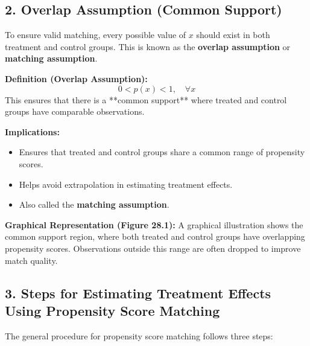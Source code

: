 \documentclass[10pt, oneside]{article}
\begin{document}
\subsection{2. Overlap Assumption (Common Support)}
To ensure valid matching, every possible value of $x$ should exist in both treatment and control groups. This is known as the \textbf{overlap assumption} or \textbf{matching assumption}.

\textbf{Definition (Overlap Assumption):}
\begin{equation}
0 < p(x) < 1, \quad \forall x
\end{equation}
This ensures that there is a **common support** where treated and control groups have comparable observations.

\textbf{Implications:}
\begin{itemize}
    \item Ensures that treated and control groups share a common range of propensity scores.
    \item Helps avoid extrapolation in estimating treatment effects.
    \item Also called the \textbf{matching assumption}.
\end{itemize}

\textbf{Graphical Representation (Figure 28.1):}  
A graphical illustration shows the common support region, where both treated and control groups have overlapping propensity scores. Observations outside this range are often dropped to improve match quality.

\subsection{3. Steps for Estimating Treatment Effects Using Propensity Score Matching}
The general procedure for propensity score matching follows three steps:
\end{document}
